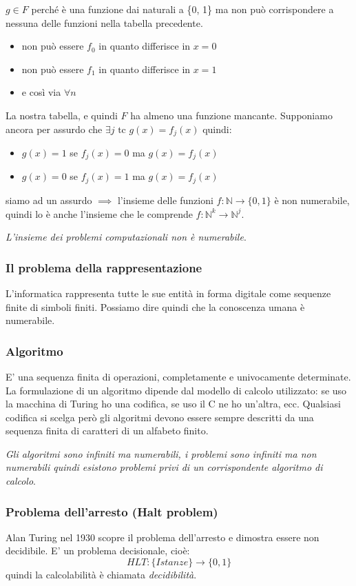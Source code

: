 $g \in F$ perché è una funzione dai naturali a \{0, 1\} ma non può corrispondere a nessuna delle funzioni nella tabella precedente.
\begin{itemize}
    \item non può essere $f_0$ in quanto differisce in $x = 0$
    \item non può essere $f_1$ in quanto differisce in $x = 1$
    \item e così via $\forall n$
\end{itemize}
La nostra tabella, e quindi $F$ ha almeno una funzione mancante. Supponiamo ancora per assurdo che $\exists j \text{ tc } g(x) = f_{j}(x)$ quindi:
\begin{itemize}
    \item $g(x) = 1$ se $f_j(x) = 0$ ma $g(x)=f_j(x)$ 
    \item $g(x) = 0$ se $f_j(x) = 1$ ma $g(x)=f_j(x)$ 
\end{itemize}
siamo ad un assurdo $\implies$ l'insieme delle funzioni $f: \mathbb{N} \longrightarrow \{0, 1\}$ è non numerabile, quindi lo è anche l'insieme che le comprende $f:\mathbb{N}^{k} \longrightarrow \mathbb{N}^{j}$.

\emph{L'insieme dei problemi computazionali non è numerabile}.

\subsubsection{Il problema della rappresentazione}
L'informatica rappresenta tutte le sue entità in forma digitale come sequenze finite di simboli finiti. Possiamo dire quindi che la conoscenza umana è numerabile.

\subsubsection{Algoritmo}
E' una sequenza finita di operazioni, completamente e univocamente determinate. La formulazione di un algoritmo dipende dal modello di calcolo utilizzato: se uso la macchina di Turing ho una codifica, se uso il C ne ho un'altra, ecc. Qualsiasi codifica si scelga però gli algoritmi devono essere sempre descritti da una sequenza finita di caratteri di un alfabeto finito.

\emph{Gli algoritmi sono infiniti ma numerabili, i problemi sono infiniti ma non numerabili quindi esistono problemi privi di un corrispondente algoritmo di calcolo}.

\subsubsection{Problema dell'arresto (Halt problem)}
Alan Turing nel 1930 scopre il problema dell'arresto e dimostra essere non decidibile. E' un problema decisionale, cioè:
$$ HLT:\{Istanze\} \longrightarrow \{0, 1\} $$
quindi la calcolabilità è chiamata \emph{decidibilità}.

